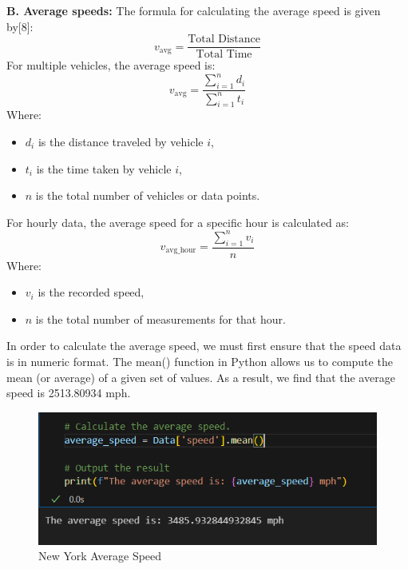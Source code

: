 \textbf{B. Average speeds:}
\newline
The formula for calculating the average speed is given by[8]:
\begin{equation}
v_{\text{avg}} = \frac{\text{Total Distance}}{\text{Total Time}}
\end{equation}
For multiple vehicles, the average speed is:
\begin{equation}
v_{\text{avg}} = \frac{\sum_{i=1}^{n} d_i}{\sum_{i=1}^{n} t_i}
\end{equation}
Where:
\begin{itemize}
    \item \( d_i \) is the distance traveled by vehicle \( i \),
    \item \( t_i \) is the time taken by vehicle \( i \),
    \item \( n \) is the total number of vehicles or data points.
\end{itemize}
For hourly data, the average speed for a specific hour is calculated as:
\begin{equation}
v_{\text{avg\_hour}} = \frac{\sum_{i=1}^{n} v_i}{n}
\end{equation}
Where:
\newline
\begin{itemize}
    \item \( v_i \) is the recorded speed,
    \item \( n \) is the total number of measurements for that hour.
\end{itemize}
In order to calculate the average speed, we must first ensure that the speed data is in numeric format. The mean() function in Python allows us to compute the mean (or average) of a given set of values. As a result, we find that the average speed is 2513.80934 mph.
\begin{figure}[H]
    \centering
    \includegraphics[width=1\linewidth]{figures/average_speed.PNG}
    \caption{New York Average Speed}
    \label{fig:new_york_peak_hours}
\end{figure}
